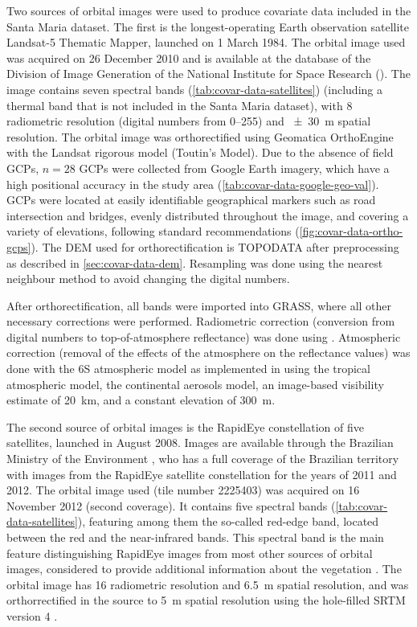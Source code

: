 Two sources of orbital images were used to produce covariate data included in the Santa Maria dataset. The 
first is the longest-operating Earth observation satellite Landsat-5 Thematic Mapper, launched on \num{1} March 
\num{1984}. The orbital image used was acquired on \num{26} December \num{2010} and is available at the 
database of the Division of Image Generation of the National Institute for Space Research (\inpedgi). The 
image contains seven spectral bands (\autoref{tab:covar-data-satellites}) (including a thermal band that is not
included in the Santa Maria dataset), with \SI{8}{\bit} radiometric resolution (digital numbers from 
\numrange{0}{255}) and \SI{\pm30}{\m} spatial resolution. The orbital image was orthorectified using 
Geomatica\textregistered{} OrthoEngine\textregistered{} with the Landsat rigorous model (Toutin's Model). Due 
to the absence of field GCPs, $n = 28$ GCPs were collected from Google Earth\textregistered{} imagery, which 
have a high positional accuracy in the study area (\autoref{tab:covar-data-google-geo-val}). GCPs were located 
at easily identifiable geographical markers such as road intersection and bridges, evenly distributed 
throughout the image, and covering a variety of elevations, following standard recommendations 
\cite{PCIGeomatics2007} (\autoref{fig:covar-data-ortho-gcps}). The DEM used for orthorectification is TOPODATA 
after preprocessing as described in \autoref{sec:covar-data-dem}. Resampling was done using the nearest 
neighbour method to avoid changing the digital numbers.

After orthorectification, all bands were imported into GRASS, where all other necessary corrections were 
performed. Radiometric correction (conversion from digital numbers to top-of-atmosphere reflectance) was done
using . Atmospheric correction (removal of the effects of the atmosphere on the 
reflectance values) was done with the 6S atmospheric model \cite{VermoteEtAl1997} as implemented in 
 using the tropical atmospheric model, the continental aerosols model, an image-based 
visibility estimate of \SI{20}{\km}, and a constant elevation of \SI{300}{\m}.

The second source of orbital images is the RapidEye constellation of five satellites, launched in August 
\num{2008}. Images are available through the Brazilian Ministry of the Environment \cite{Brasil2012}, who 
has a full coverage of the Brazilian territory with images from the RapidEye satellite constellation for the 
years of \num{2011} and \num{2012}. The orbital image used (tile number \num{2225403}) was acquired on \num{16} 
November \num{2012} (second coverage). It contains five spectral bands (\autoref{tab:covar-data-satellites}), 
featuring among them the so-called red-edge band, located between the red and the near-infrared bands. This 
spectral band is the main feature distinguishing RapidEye images from most other sources of orbital images, 
considered to provide additional information about the vegetation \cite{WeicheltEtAl2013}. The orbital image 
has \SI{16}{\bit} radiometric resolution and \SI{6.5}{\m} spatial resolution, and was orthorrectified in the 
source to \SI{5}{\m} spatial resolution using the hole-filled SRTM version \num{4} \cite{RapidEye2013}.

